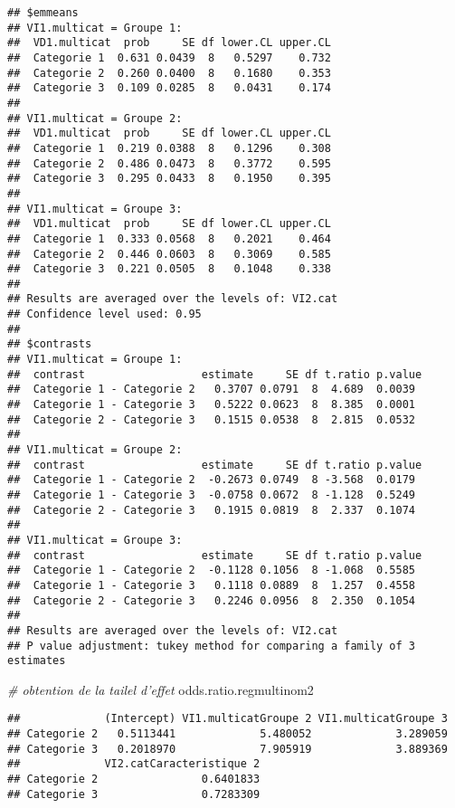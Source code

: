 \documentclass[
]{book}
\newenvironment{Shaded}{\begin{snugshade}}{\end{snugshade}}
\newcommand{\CommentTok}[1]{\textcolor[rgb]{0.56,0.35,0.01}{\textit{#1}}}
\newcommand{\NormalTok}[1]{#1}
\begin{document}
\begin{verbatim}
## $emmeans
## VI1.multicat = Groupe 1:
##  VD1.multicat  prob     SE df lower.CL upper.CL
##  Categorie 1  0.631 0.0439  8   0.5297    0.732
##  Categorie 2  0.260 0.0400  8   0.1680    0.353
##  Categorie 3  0.109 0.0285  8   0.0431    0.174
## 
## VI1.multicat = Groupe 2:
##  VD1.multicat  prob     SE df lower.CL upper.CL
##  Categorie 1  0.219 0.0388  8   0.1296    0.308
##  Categorie 2  0.486 0.0473  8   0.3772    0.595
##  Categorie 3  0.295 0.0433  8   0.1950    0.395
## 
## VI1.multicat = Groupe 3:
##  VD1.multicat  prob     SE df lower.CL upper.CL
##  Categorie 1  0.333 0.0568  8   0.2021    0.464
##  Categorie 2  0.446 0.0603  8   0.3069    0.585
##  Categorie 3  0.221 0.0505  8   0.1048    0.338
## 
## Results are averaged over the levels of: VI2.cat 
## Confidence level used: 0.95 
## 
## $contrasts
## VI1.multicat = Groupe 1:
##  contrast                  estimate     SE df t.ratio p.value
##  Categorie 1 - Categorie 2   0.3707 0.0791  8  4.689  0.0039 
##  Categorie 1 - Categorie 3   0.5222 0.0623  8  8.385  0.0001 
##  Categorie 2 - Categorie 3   0.1515 0.0538  8  2.815  0.0532 
## 
## VI1.multicat = Groupe 2:
##  contrast                  estimate     SE df t.ratio p.value
##  Categorie 1 - Categorie 2  -0.2673 0.0749  8 -3.568  0.0179 
##  Categorie 1 - Categorie 3  -0.0758 0.0672  8 -1.128  0.5249 
##  Categorie 2 - Categorie 3   0.1915 0.0819  8  2.337  0.1074 
## 
## VI1.multicat = Groupe 3:
##  contrast                  estimate     SE df t.ratio p.value
##  Categorie 1 - Categorie 2  -0.1128 0.1056  8 -1.068  0.5585 
##  Categorie 1 - Categorie 3   0.1118 0.0889  8  1.257  0.4558 
##  Categorie 2 - Categorie 3   0.2246 0.0956  8  2.350  0.1054 
## 
## Results are averaged over the levels of: VI2.cat 
## P value adjustment: tukey method for comparing a family of 3 estimates
\end{verbatim}

\begin{Shaded}
\begin{Highlighting}[]
\CommentTok{# obtention de la tailel d'effet}
\NormalTok{odds.ratio.regmultinom2}
\end{Highlighting}
\end{Shaded}

\begin{verbatim}
##             (Intercept) VI1.multicatGroupe 2 VI1.multicatGroupe 3
## Categorie 2   0.5113441             5.480052             3.289059
## Categorie 3   0.2018970             7.905919             3.889369
##             VI2.catCaracteristique 2
## Categorie 2                0.6401833
## Categorie 3                0.7283309
\end{verbatim}
\end{document}
